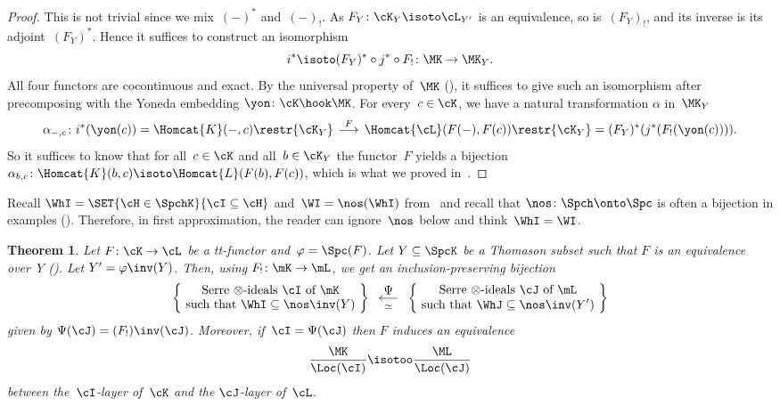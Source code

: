 \documentclass[11pt]{amsart}
\numberwithin{equation}{section} %
\theoremstyle{plain}
\newtheorem{thm}[equation]{Theorem}
\theoremstyle{definition}
\theoremstyle{remark}
\begin{document}
\begin{proof}
This is not trivial since we mix~$(-)^*$ and~$(-)_!$. As $F_Y\colon \cK_Y\isoto \cL_{Y'}$ is an equivalence, so is~$(F_Y)_!$, and its inverse is its adjoint~$(F_Y)^*$. Hence it suffices to construct an isomorphism
%
\[
i^*\isoto (F_Y)^*\circ j^*\circ F_! \colon \MK\to \MK_Y.
\]
%
All four functors are cocontinuous and exact. By the universal property of~$\MK$ (\cite[Lemma~2.2]{Krause00}), it suffices to give such an isomorphism after precomposing with the Yoneda embedding $\yon\colon \cK\hook \MK$. For every~$c\in\cK$, we have a natural transformation $\alpha$ in~$\MK_Y$
%
\[
\alpha_{-,c}\colon i^*(\yon(c))=\Homcat{K}(-,c)\restr{\cK_Y}\overset{F}{\,\longrightarrow\,}
\Homcat{\cL}(F(-),F(c))\restr{\cK_Y}=(F_Y)^*(j^*(F_!(\yon(c)))).
\]
%
So it suffices to know that for all~$c\in\cK$ and all~$b\in \cK_Y$ the functor~$F$ yields a bijection $\alpha_{b,c}\colon\Homcat{K}(b,c)\isoto \Homcat{L}(F(b),F(c))$, which is what we proved in~.
\end{proof}

Recall $\WhI=\SET{\cH\in\SpchK}{\cI\subseteq \cH}$ and~$\WI=\nos(\WhI)$ from~ and recall that $\nos\colon \Spch\onto \Spc$ is often a bijection in examples (). Therefore, in first approximation, the reader can ignore~$\nos$ below and think~$\WhI=\WI$.
%
\begin{thm}
\label{thm:main}%
Let $F\colon \cK\to \cL$ be a tt-functor and~$\varphi=\Spc(F)$. Let $Y\subseteq \SpcK$ be a Thomason subset such that $F$ is an equivalence over~$Y$ (). Let $Y'=\varphi\inv(Y)$. Then, using $F_!\colon \mK\to \mL$, we get an inclusion-preserving bijection
%
\[
\left\{\ 
\substack{\displaystyle\textrm{Serre $\otimes$-ideals~$\cI$ of~$\mK$}
\\[.2em]
\displaystyle\textrm{such that $\WhI\subseteq \nos\inv(Y)$}}
\ \right\}
\ \overset{\displaystyle\Psi}{\underset{\simeq}{\,\longleftarrow\,}}\ 
\left\{\ 
\substack{\displaystyle\textrm{Serre $\otimes$-ideals~$\cJ$ of~$\mL$}
\\[.2em]
\displaystyle\textrm{such that $\WhJ\subseteq \nos\inv(Y')$}}
\ \right\}
\]
%
given by $\Psi(\cJ)=(F_!)\inv(\cJ)$.
Moreover, if~$\cI=\Psi(\cJ)$ then $F$ induces an equivalence
%
\begin{equation}
\label{eq:main}%
\frac{\MK}{\Loc(\cI)}\isotoo\frac{\ML}{\Loc(\cJ)}
\end{equation}
%
between the~$\cI$-layer of~$\cK$ and the $\cJ$-layer of~$\cL$.
\end{thm}
\end{document}
